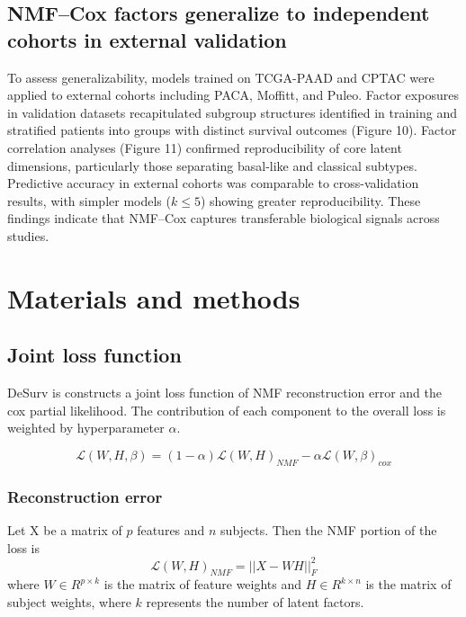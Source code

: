\documentclass[
]{article}
\begin{document}
\subsection{NMF--Cox factors generalize to independent cohorts in
external
validation}\label{nmfcox-factors-generalize-to-independent-cohorts-in-external-validation}

To assess generalizability, models trained on TCGA-PAAD and CPTAC were
applied to external cohorts including PACA, Moffitt, and Puleo. Factor
exposures in validation datasets recapitulated subgroup structures
identified in training and stratified patients into groups with distinct
survival outcomes (Figure 10). Factor correlation analyses (Figure 11)
confirmed reproducibility of core latent dimensions, particularly those
separating basal-like and classical subtypes. Predictive accuracy in
external cohorts was comparable to cross-validation results, with
simpler models (\(k\leq 5\)) showing greater reproducibility. These
findings indicate that NMF--Cox captures transferable biological signals
across studies.

\section*{Materials and methods}\label{materials-and-methods}

\subsection{Joint loss function}\label{joint-loss-function}

DeSurv is constructs a joint loss function of NMF reconstruction error
and the cox partial likelihood. The contribution of each component to
the overall loss is weighted by hyperparameter \(\alpha\).

\begin{equation}
    \mathcal{L}(W,H,\beta) = (1-\alpha) \mathcal{L}(W,H)_{NMF} - \alpha \mathcal{L}(W,\beta)_{cox}
\end{equation}

\subsubsection{Reconstruction error}\label{reconstruction-error}

Let X be a matrix of \(p\) features and \(n\) subjects. Then the NMF
portion of the loss is \begin{equation}
    \mathcal{L}(W,H)_{NMF} = ||X - WH||^2_F
\end{equation} where \(W \in R^{p \times k}\) is the matrix of feature
weights and \(H \in R^{k \times n}\) is the matrix of subject weights,
where \(k\) represents the number of latent factors.
\end{document}
